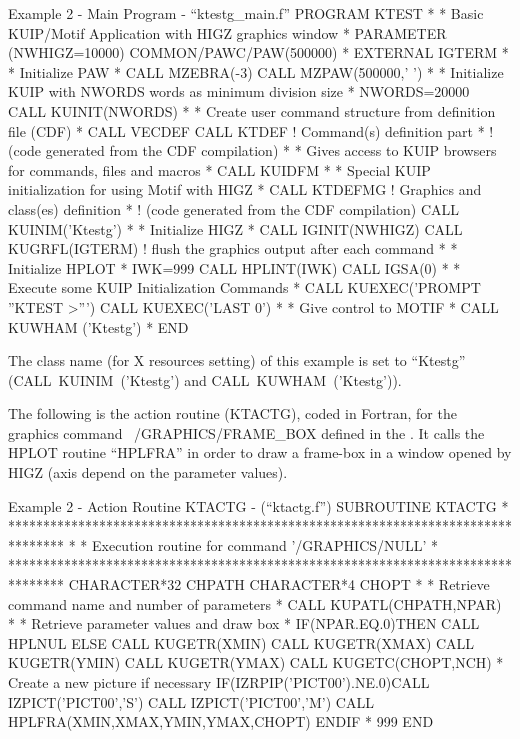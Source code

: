 \begin{XMPt} {Example 2 - Main Program - ``ktestg\_main.f''}
      PROGRAM KTEST
*
* Basic KUIP/Motif Application with HIGZ graphics window
*
      PARAMETER (NWHIGZ=10000)
      COMMON/PAWC/PAW(500000)
*
      EXTERNAL      IGTERM
*
* Initialize PAW
*
      CALL MZEBRA(-3)
      CALL MZPAW(500000,' ')
*
* Initialize KUIP with NWORDS words as minimum division size
*
      NWORDS=20000
      CALL KUINIT(NWORDS)
*
* Create user command structure from definition file (CDF)
*
      CALL VECDEF
      CALL KTDEF          ! Command(s) definition part
*                         ! (code generated from the CDF compilation)
*
* Gives access to KUIP browsers for commands, files and macros
*
      CALL KUIDFM
*
* Special KUIP initialization for using Motif with HIGZ
*
      CALL KTDEFMG        ! Graphics and class(es) definition
*                         ! (code generated from the CDF compilation)
      CALL KUINIM('Ktestg')
*
* Initialize HIGZ
*
      CALL IGINIT(NWHIGZ)
      CALL KUGRFL(IGTERM)   ! flush the graphics output after each command
*
* Initialize HPLOT
*
      IWK=999
      CALL HPLINT(IWK)
      CALL IGSA(0)
*
* Execute some KUIP Initialization Commands
*
      CALL KUEXEC('PROMPT ''KTEST >''')
      CALL KUEXEC('LAST 0')
*
* Give control to MOTIF
*
      CALL KUWHAM ('Ktestg')
*  
      END
\end{XMPt}

The class name (for X resources setting) of this example is set to 
``Ktestg'' (CALL~KUINIM~('Ktestg') and CALL~KUWHAM~('Ktestg')).

The following is the action routine (KTACTG), coded in Fortran, for the
graphics command ~/GRAPHICS/FRAME\_BOX defined in the \CDF{}. It 
calls the HPLOT routine ``HPLFRA'' in order to draw a frame-box in a window 
opened by HIGZ (axis depend on the parameter values).

\begin{XMPt} {Example 2 - Action Routine KTACTG - (``ktactg.f'')}
      SUBROUTINE KTACTG
*
********************************************************************************
*
* Execution routine for command '/GRAPHICS/NULL'
*
********************************************************************************
      CHARACTER*32 CHPATH
      CHARACTER*4 CHOPT
*
* Retrieve command name and number of parameters
*
      CALL KUPATL(CHPATH,NPAR)
*
* Retrieve parameter values and draw box
*
      IF(NPAR.EQ.0)THEN
         CALL HPLNUL
      ELSE
         CALL KUGETR(XMIN)
         CALL KUGETR(XMAX)
         CALL KUGETR(YMIN)
         CALL KUGETR(YMAX)
         CALL KUGETC(CHOPT,NCH)
*        Create a new picture if necessary
         IF(IZRPIP('PICT00').NE.0)CALL IZPICT('PICT00','S')
         CALL IZPICT('PICT00','M')
         CALL HPLFRA(XMIN,XMAX,YMIN,YMAX,CHOPT)
      ENDIF
*
999   END
\end{XMPt}

